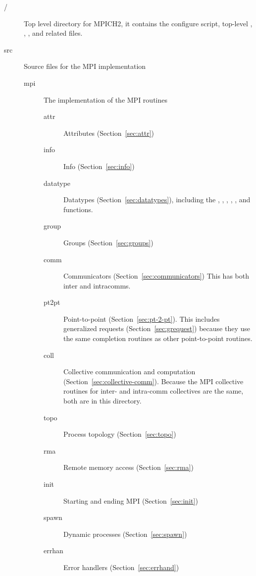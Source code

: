 \documentclass{article}
\begin{document}
\begin{description}
\item[/]Top level directory for MPICH2, it contains the configure script,
  top-level , , , and related
  files. 
\item[src]Source files for the MPI implementation
  \begin{description}
  \item[mpi]The implementation of the MPI routines
    \begin{description}
    \item[attr]Attributes (Section~\ref{sec:attr})
    \item[info]Info (Section~\ref{sec:info})
    \item[datatype]Datatypes (Section~\ref{sec:datatypes}), including the
      , , ,
      , , and
       functions.
    \item[group]Groups (Section~\ref{sec:groups})
    \item[comm]Communicators (Section~\ref{sec:communicators})
      This has both inter and intracomms.
    \item[pt2pt]Point-to-point (Section~\ref{sec:pt-2-pt}).  This
    includes generalized requests (Section~\ref{sec:grequest}) because
    they use the same completion  
    routines as other point-to-point routines.
    \item[coll]Collective communication and computation
      (Section~\ref{sec:collective-comm}).  Because the MPI collective
      routines for inter- and intra-comm collectives are the same,
      both are in this directory.
    \item[topo]Process topology (Section~\ref{sec:topo})
    \item[rma]Remote memory access (Section~\ref{sec:rma})
    \item[init]Starting and ending MPI (Section~\ref{sec:init})
    \item[spawn]Dynamic processes (Section~\ref{sec:spawn})
    \item[errhan]Error handlers (Section~\ref{sec:errhand})

\end{description}
\end{description}
\end{description}
\end{document}
